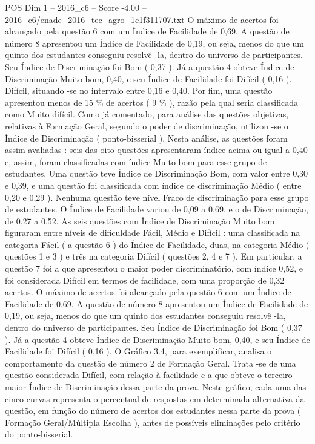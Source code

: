 \begin{textsample}{POS Dim 1 – 2016\_c6 – Score -4.00 – 2016\_c6/enade\_2016\_tec\_agro\_1c1f311707.txt}
O máximo de acertos foi alcançado pela questão 6 com um Índice de Facilidade de 0,69.
A questão de número 8 apresentou um Índice de Facilidade de 0,19, ou seja, menos do que um quinto dos estudantes conseguiu resolvê -la, dentro do universo de participantes.
Seu Índice de Discriminação foi Bom ( 0,37 ).
Já a questão 4 obteve Índice de Discriminação Muito bom, 0,40, e seu Índice de Facilidade foi Difícil ( 0,16 ).
Difícil, situando -se no intervalo entre 0,16 e 0,40.
Por fim, uma questão apresentou menos de 15 \% de acertos ( 9 \% ), razão pela qual seria classificada como Muito difícil.
Como já comentado, para análise das questões objetivas, relativas à Formação Geral, segundo o poder de discriminação, utilizou -se o Índice de Discriminação ( ponto-bisserial ).
Nesta análise, as questões foram assim avaliadas : seis das oito questões apresentaram índice acima ou igual a 0,40 e, assim, foram classificadas com índice Muito bom para esse grupo de estudantes.
Uma questão teve Índice de Discriminação Bom, com valor entre 0,30 e 0,39, e uma questão foi classificada com índice de discriminação Médio ( entre 0,20 e 0,29 ).
Nenhuma questão teve nível Fraco de discriminação para esse grupo de estudantes.
O Índice de Facilidade variou de 0,09 a 0,69, e o de Discriminação, de 0,27 a 0,52.
As seis questões com Índice de Discriminação Muito bom figuraram entre níveis de dificuldade Fácil, Médio e Difícil : uma classificada na categoria Fácil ( a questão 6 ) do Índice de Facilidade, duas, na categoria Médio ( questões 1 e 3 ) e três na categoria Difícil ( questões 2, 4 e 7 ).
Em particular, a questão 7 foi a que apresentou o maior poder discriminatório, com índice 0,52, e foi considerada Difícil em termos de facilidade, com uma proporção de 0,32 acertos.
O máximo de acertos foi alcançado pela questão 6 com um Índice de Facilidade de 0,69.
A questão de número 8 apresentou um Índice de Facilidade de 0,19, ou seja, menos do que um quinto dos estudantes conseguiu resolvê -la, dentro do universo de participantes.
Seu Índice de Discriminação foi Bom ( 0,37 ).
Já a questão 4 obteve Índice de Discriminação Muito bom, 0,40, e seu Índice de Facilidade foi Difícil ( 0,16 ).
O Gráfico 3.4, para exemplificar, analisa o comportamento da questão de número 2 de Formação Geral.
Trata -se de uma questão considerada Difícil, com relação à facilidade e a que obteve o terceiro maior Índice de Discriminação dessa parte da prova.
Neste gráfico, cada uma das cinco curvas representa o percentual de respostas em determinada alternativa da questão, em função do número de acertos dos estudantes nessa parte da prova ( Formação Geral/Múltipla Escolha ), antes de possíveis eliminações pelo critério do ponto-bisserial.

\end{textsample}
